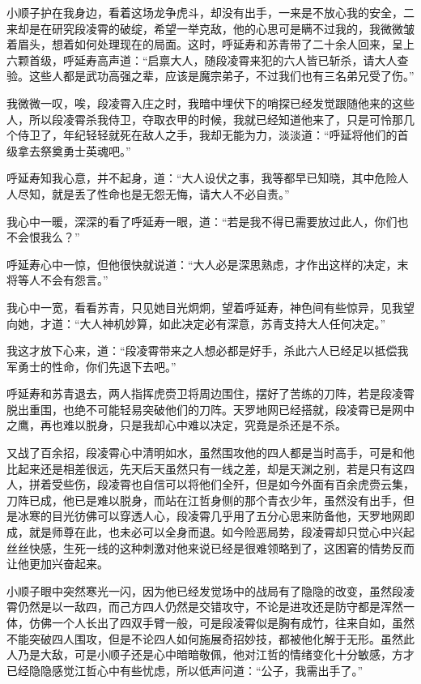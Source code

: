 小顺子护在我身边，看着这场龙争虎斗，却没有出手，一来是不放心我的安全，二来却是在研究段凌霄的破绽，希望一举克敌，他的心思可是瞒不过我的，我微微皱着眉头，想着如何处理现在的局面。这时，呼延寿和苏青带了二十余人回来，呈上六颗首级，呼延寿高声道：“启禀大人，随段凌霄来犯的六人皆已斩杀，请大人查验。这些人都是武功高强之辈，应该是魔宗弟子，不过我们也有三名弟兄受了伤。”

我微微一叹，唉，段凌霄入庄之时，我暗中埋伏下的哨探已经发觉跟随他来的这些人，所以段凌霄杀我侍卫，夺取衣甲的时候，我就已经知道他来了，只是可怜那几个侍卫了，年纪轻轻就死在敌人之手，我却无能为力，淡淡道：“呼延将他们的首级拿去祭奠勇士英魂吧。”

呼延寿知我心意，并不起身，道：“大人设伏之事，我等都早已知晓，其中危险人人尽知，就是丢了性命也是无怨无悔，请大人不必自责。”

我心中一暖，深深的看了呼延寿一眼，道：“若是我不得已需要放过此人，你们也不会恨我么？”

呼延寿心中一惊，但他很快就说道：“大人必是深思熟虑，才作出这样的决定，末将等人不会有怨言。”

我心中一宽，看看苏青，只见她目光炯炯，望着呼延寿，神色间有些惊异，见我望向她，才道：“大人神机妙算，如此决定必有深意，苏青支持大人任何决定。”

我这才放下心来，道：“段凌霄带来之人想必都是好手，杀此六人已经足以抵偿我军勇士的性命，你们先退下去吧。”

呼延寿和苏青退去，两人指挥虎赍卫将周边围住，摆好了苦练的刀阵，若是段凌霄脱出重围，也绝不可能轻易突破他们的刀阵。天罗地网已经搭就，段凌霄已是网中之鹰，再也难以脱身，只是我却心中难以决定，究竟是杀还是不杀。

又战了百余招，段凌霄心中清明如水，虽然围攻他的四人都是当时高手，可是和他比起来还是相差很远，先天后天虽然只有一线之差，却是天渊之别，若是只有这四人，拼着受些伤，段凌霄也自信可以将他们全歼，但是如今外面有百余虎赍云集，刀阵已成，他已是难以脱身，而站在江哲身侧的那个青衣少年，虽然没有出手，但是冰寒的目光彷佛可以穿透人心，段凌霄几乎用了五分心思来防备他，天罗地网即成，就是师尊在此，也未必可以全身而退。如今险恶局势，段凌霄却只觉心中兴起丝丝快感，生死一线的这种刺激对他来说已经是很难领略到了，这困窘的情势反而让他更加兴奋起来。

小顺子眼中突然寒光一闪，因为他已经发觉场中的战局有了隐隐的改变，虽然段凌霄仍然是以一敌四，而己方四人仍然是交错攻守，不论是进攻还是防守都是浑然一体，仿佛一个人长出了四双手臂一般，可是段凌霄似是胸有成竹，往来自如，虽然不能突破四人围攻，但是不论四人如何施展奇招妙技，都被他化解于无形。虽然此人乃是大敌，可是小顺子还是心中暗暗敬佩，他对江哲的情绪变化十分敏感，方才已经隐隐感觉江哲心中有些忧虑，所以低声问道：“公子，我需出手了。”


